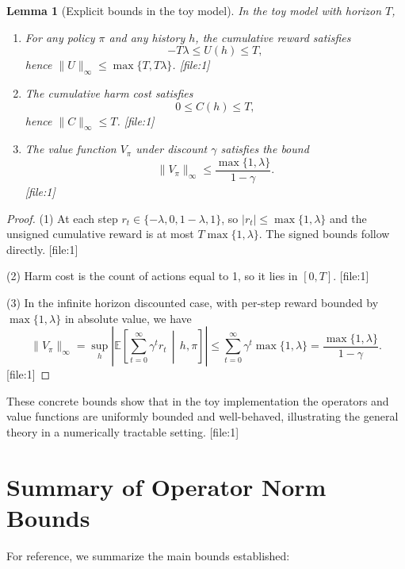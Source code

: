 \documentclass[11pt,a4paper]{article}
\theoremstyle{tealstyle}
\newtheorem{lemma}[theorem]{Lemma}
\theoremstyle{definition}
\begin{document}
\begin{lemma}[Explicit bounds in the toy model]
In the toy model with horizon \(T\),

\begin{enumerate}[noitemsep]
  \item For any policy \(\pi\) and any history \(h\), the cumulative reward satisfies
  \[
    -T \lambda \le U(h) \le T,
  \]
  hence \(\|U\|_\infty \le \max\{T, T\lambda\}\). [file:1]
  \item The cumulative harm cost satisfies
  \[
    0 \le C(h) \le T,
  \]
  hence \(\|C\|_\infty \le T\). [file:1]
  \item The value function \(V_\pi\) under discount \(\gamma\) satisfies the bound
  \[
    \|V_\pi\|_\infty \le \frac{\max\{1,\lambda\}}{1-\gamma}.
  \] [file:1]
\end{enumerate}
\end{lemma}

\begin{proof}
(1) At each step \(r_t \in \{-\lambda, 0, 1-\lambda, 1\}\), so \(|r_t| \le \max\{1,\lambda\}\) and the unsigned cumulative reward is at most \(T\max\{1,\lambda\}\). The signed bounds follow directly. [file:1]

(2) Harm cost is the count of actions equal to 1, so it lies in \([0,T]\). [file:1]

(3) In the infinite horizon discounted case, with per-step reward bounded by \(\max\{1,\lambda\}\) in absolute value, we have
\[
  \|V_\pi\|_\infty 
  = \sup_{h} \left|\mathbb{E}\left[\sum_{t=0}^{\infty} \gamma^t r_t \,\middle|\, h,\pi\right]\right|
  \le \sum_{t=0}^{\infty} \gamma^t \max\{1,\lambda\}
  = \frac{\max\{1,\lambda\}}{1-\gamma}.
\] [file:1]
\end{proof}

These concrete bounds show that in the toy implementation the operators and value functions are uniformly bounded and well-behaved, illustrating the general theory in a numerically tractable setting. [file:1]

\section{Summary of Operator Norm Bounds}

For reference, we summarize the main bounds established:
\end{document}
